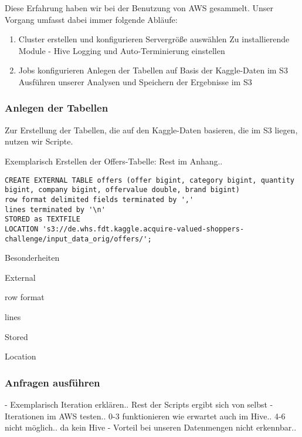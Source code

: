 Diese Erfahrung haben wir bei der Benutzung von AWS gesammelt. Unser Vorgang umfasst dabei immer folgende Abläufe:
\begin{enumerate}
\item Cluster erstellen und konfigurieren
\subitem Servergröße auswählen
\subitem Zu installierende Module - Hive
\subitem Logging und Auto-Terminierung einstellen
\item Jobs konfigurieren
\subitem Anlegen der Tabellen auf Basis der Kaggle-Daten im S3
\subitem Ausführen unserer Analysen und Speichern der Ergebnisse im S3
\end{enumerate}

\subsubsection{Anlegen der Tabellen}
Zur Erstellung der Tabellen, die auf den Kaggle-Daten basieren, die im S3 liegen, nutzen wir Scripte. 

Exemplarisch Erstellen der Offers-Tabelle: Rest im Anhang..

\begin{lstlisting}[style=hive]
CREATE EXTERNAL TABLE offers (offer bigint, category bigint, quantity bigint, company bigint, offervalue double, brand bigint)
row format delimited fields terminated by ','
lines terminated by '\n'
STORED as TEXTFILE
LOCATION 's3://de.whs.fdt.kaggle.acquire-valued-shoppers- challenge/input_data_orig/offers/';
\end{lstlisting}

Besonderheiten
\begin{description}
\item External
\item row format
\item lines
\item Stored
\item Location
\end{description}

\subsubsection{Anfragen ausführen}

- Exemplarisch Iteration erklären.. Rest der Scripts ergibt sich von selbst
- Iterationen im AWS testen.. 0-3 funktionieren wie erwartet auch im Hive.. 4-6 nicht möglich.. da kein Hive
- Vorteil bei unseren Datenmengen nicht erkennbar..


